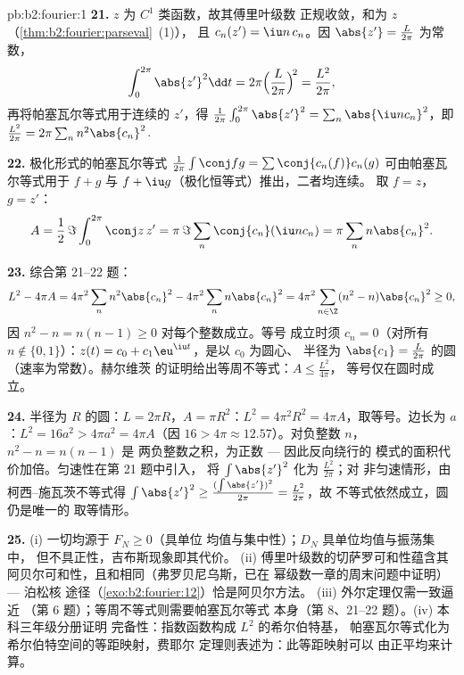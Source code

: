 \begin{solution}{pb:b2:fourier:1}
\textbf{21.} $z$ 为 $C^1$ 类函数，故其傅里叶级数
正规收敛，和为 $z$（\cref{thm:b2:fourier:parseval}~(1)），
且 $c_n(z') = \iu n\,c_n$。因 $\abs{z'} = \frac{L}{2\pi}$
为常数，
\[
\int_0^{2\pi}\abs{z'}^2\dd t
= 2\pi\Bigl(\frac{L}{2\pi}\Bigr)^{\!2}
= \frac{L^2}{2\pi} ,
\]
再将帕塞瓦尔等式用于连续的 $z'$，得
$\frac{1}{2\pi}\int_0^{2\pi}\abs{z'}^2 =
\sum_n\abs{\iu nc_n}^2$，即 $\frac{L^2}{2\pi} = 2\pi\sum_n
n^2\abs{c_n}^2$.

\textbf{22.} 极化形式的帕塞瓦尔等式 $\frac{1}{2\pi}\int\conj
fg = \sum\conj{c_n(f)}c_n(g)$ 可由帕塞瓦尔等式用于
$f + g$ 与 $f + \iu g$（极化恒等式）推出，二者均连续。
取 $f = z$，$g = z'$：
\[
A = \frac12\,\Im\int_0^{2\pi}\conj z\,z'
= \pi\,\Im\sum_n\conj{c_n}(\iu n c_n)
= \pi\sum_n n\abs{c_n}^2 .
\]

\textbf{23.} 综合第 21--22 题：
\[
L^2 - 4\pi A
= 4\pi^2\sum_n n^2\abs{c_n}^2 -
4\pi^2\sum_n n\abs{c_n}^2
= 4\pi^2\sum_{n\in\Z}(n^2 - n)\abs{c_n}^2 \geq 0 ,
\]
因 $n^2 - n = n(n-1) \geq 0$ 对每个整数成立。等号
成立时须 $c_n = 0$（对所有 $n \notin \{0, 1\}$）：$z(t) = c_0 +
c_1\eu^{\iu t}$，是以 $c_0$ 为圆心、
半径为 $\abs{c_1} = \frac{L}{2\pi}$ 的圆（速率为常数）。赫尔维茨
的证明给出等周不等式：$A \leq \frac{L^2}{4\pi}$，
等号仅在圆时成立。

\textbf{24.} 半径为 $R$ 的圆：$L = 2\pi R$，$A = \pi
R^2$：$L^2 = 4\pi^2R^2 = 4\pi A$，取等号。边长为
$a$：$L^2 = 16a^2 > 4\pi a^2 = 4\pi A$（因 $16 > 4\pi \approx
12.57$）。对负整数 $n$，$n^2 - n = n(n - 1)$ 是
两负整数之积，为正数 --- 因此反向绕行的
模式的面积代价加倍。匀速性在第 21 题中引入，
将 $\int\abs{z'}^2$ 化为 $\frac{L^2}{2\pi}$；对
非匀速情形，由柯西–施瓦茨不等式得 $\int\abs{z'}^2 \geq
\frac{(\int\abs{z'})^2}{2\pi} = \frac{L^2}{2\pi}$，故
不等式依然成立，圆仍是唯一的
取等情形。

\textbf{25.} (i) 一切均源于 $F_N \geq 0$（具单位
均值与集中性）；$D_N$ 具单位均值与振荡集中，
但不具正性，吉布斯现象即其代价。
(ii) 傅里叶级数的切萨罗可和性蕴含其
阿贝尔可和性，且和相同（弗罗贝尼乌斯，已在
幂级数一章的周末问题中证明） --- 泊松核
途径（\cref{exo:b2:fourier:12}）恰是阿贝尔方法。
(iii) 外尔定理仅需一致逼近
（第 6 题）；等周不等式则需要帕塞瓦尔等式
本身（第 8、21--22 题）。(iv) 本科三年级分册证明
完备性：指数函数构成 $L^2$ 的希尔伯特基，
帕塞瓦尔等式化为希尔伯特空间的等距映射，费耶尔
定理则表述为：此等距映射可以
由正平均来计算。
\end{solution}

